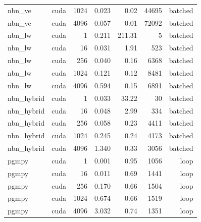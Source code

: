 \begin{table}[h]
\begin{tabular}{lrrrrrr}
    nbn\_ve & cuda & 1024 & 0.023 & 0.02 & 44695 & batched \\
    nbn\_ve & cuda & 4096 & 0.057 & 0.01 & 72092 & batched \\
    nbn\_lw & cuda & 1 & 0.211 & 211.31 & 5 & batched \\
    nbn\_lw & cuda & 16 & 0.031 & 1.91 & 523 & batched \\
    nbn\_lw & cuda & 256 & 0.040 & 0.16 & 6368 & batched \\
    nbn\_lw & cuda & 1024 & 0.121 & 0.12 & 8481 & batched \\
    nbn\_lw & cuda & 4096 & 0.594 & 0.15 & 6891 & batched \\
    nbn\_hybrid & cuda & 1 & 0.033 & 33.22 & 30 & batched \\
    nbn\_hybrid & cuda & 16 & 0.048 & 2.99 & 334 & batched \\
    nbn\_hybrid & cuda & 256 & 0.058 & 0.23 & 4411 & batched \\
    nbn\_hybrid & cuda & 1024 & 0.245 & 0.24 & 4173 & batched \\
    nbn\_hybrid & cuda & 4096 & 1.340 & 0.33 & 3056 & batched \\
    pgmpy & cuda & 1 & 0.001 & 0.95 & 1056 & loop \\
    pgmpy & cuda & 16 & 0.011 & 0.69 & 1441 & loop \\
    pgmpy & cuda & 256 & 0.170 & 0.66 & 1504 & loop \\
    pgmpy & cuda & 1024 & 0.674 & 0.66 & 1519 & loop \\
    pgmpy & cuda & 4096 & 3.032 & 0.74 & 1351 & loop \\
    \bottomrule
  \end{tabular}
\end{table}
